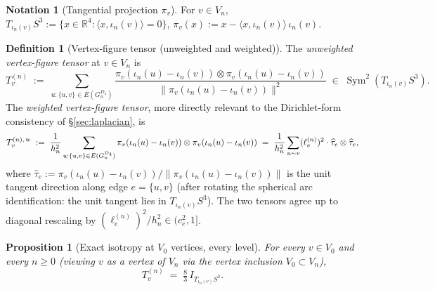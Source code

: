 \documentclass[11pt, a4paper]{amsart}
\newtheorem{proposition}[theorem]{Proposition}
\theoremstyle{definition}
\newtheorem{definition}[theorem]{Definition}
\newtheorem{notation}[theorem]{Notation}
\newcommand{\R}{\mathbb{R}}
\newcommand{\Sym}{\operatorname{Sym}}
\begin{document}
\begin{notation}[Tangential projection $\pi_v$]
\label{not:pi-v}
For $v \in V_n$, $T_{\iota_n(v)} S^3 := \{x \in \R^4 : \langle
x, \iota_n(v)\rangle = 0\}$, $\pi_v(x) := x - \langle x,
\iota_n(v)\rangle\,\iota_n(v)$.
\end{notation}

\begin{definition}[Vertex-figure tensor (unweighted and weighted)]
\label{def:T-v}
The \emph{unweighted vertex-figure tensor} at $v \in V_n$ is
\[
  T_v^{(n)} \;:=\; \sum_{u : \{u, v\} \in E(G_n^{D_4})}
    \frac{\pi_v(\iota_n(u) - \iota_n(v))
    \otimes \pi_v(\iota_n(u) - \iota_n(v))}
    {\|\pi_v(\iota_n(u) - \iota_n(v))\|^2}
  \;\in\; \Sym^2(T_{\iota_n(v)} S^3).
\]
The \emph{weighted vertex-figure tensor}, more directly relevant
to the Dirichlet-form consistency of \S\ref{sec:laplacian}, is
\[
  T_v^{(n),\,\rm w} \;:=\; \frac{1}{h_n^2}
    \sum_{u : \{u, v\} \in E(G_n^{D_4})}
    \pi_v(\iota_n(u) - \iota_n(v))
    \otimes \pi_v(\iota_n(u) - \iota_n(v))
  \;=\; \frac{1}{h_n^2}\sum_{u \sim v}
    (\ell_e^{(n)})^2 \cdot \widehat{\tau}_e \otimes \widehat{\tau}_e,
\]
where $\widehat{\tau}_e := \pi_v(\iota_n(u) - \iota_n(v))/
\|\pi_v(\iota_n(u) - \iota_n(v))\|$ is the unit tangent direction
along edge $e = \{u, v\}$ (after rotating the spherical arc
identification: the unit tangent lies in $T_{\iota_n(v)} S^3$).
The two tensors agree up to diagonal rescaling by
$(\ell_e^{(n)})^2/h_n^2 \in (c_e^2, 1]$.
\end{definition}

\begin{proposition}[Exact isotropy at $V_0$ vertices, every level]
\label{prop:v0-at-level-n}
For every $v \in V_0$ and every $n \geq 0$ (viewing $v$ as a
vertex of $V_n$ via the vertex inclusion $V_0 \subset V_n$),
\[
  T_v^{(n)} \;=\; \tfrac{8}{3}\,I_{T_{\iota_n(v)} S^3}.
\]
\end{proposition}
\end{document}
